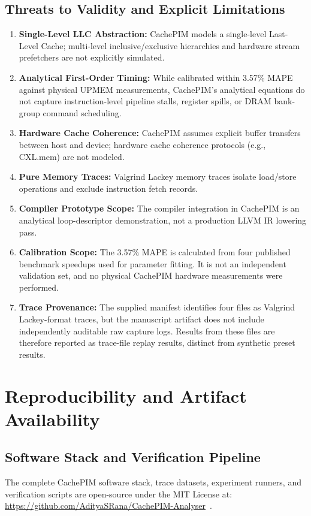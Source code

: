\documentclass[journal,10pt,twocolumn]{IEEEtran}
\begin{document}
\subsection{Threats to Validity and Explicit Limitations}
\begin{enumerate}
    \item \textbf{Single-Level LLC Abstraction:} CachePIM models a single-level Last-Level Cache; multi-level inclusive/exclusive hierarchies and hardware stream prefetchers are not explicitly simulated.
    \item \textbf{Analytical First-Order Timing:} While calibrated within 3.57\% MAPE against physical UPMEM measurements, CachePIM's analytical equations do not capture instruction-level pipeline stalls, register spills, or DRAM bank-group command scheduling.
    \item \textbf{Hardware Cache Coherence:} CachePIM assumes explicit buffer transfers between host and device; hardware cache coherence protocols (e.g., CXL.mem) are not modeled.
    \item \textbf{Pure Memory Traces:} Valgrind Lackey memory traces isolate load/store operations and exclude instruction fetch records.
    \item \textbf{Compiler Prototype Scope:} The compiler integration in CachePIM is an analytical loop-descriptor demonstration, not a production LLVM IR lowering pass.
    \item \textbf{Calibration Scope:} The 3.57\% MAPE is calculated from four published benchmark speedups used for parameter fitting. It is not an independent validation set, and no physical CachePIM hardware measurements were performed.
    \item \textbf{Trace Provenance:} The supplied manifest identifies four files as Valgrind Lackey-format traces, but the manuscript artifact does not include independently auditable raw capture logs. Results from these files are therefore reported as trace-file replay results, distinct from synthetic preset results.
\end{enumerate}

\section{Reproducibility and Artifact Availability}
\subsection{Software Stack and Verification Pipeline}
The complete CachePIM software stack, trace datasets, experiment runners, and verification scripts are open-source under the MIT License at: \url{https://github.com/AdityaSRana/CachePIM-Analyser}~\cite{Rana2026}.
\end{document}
